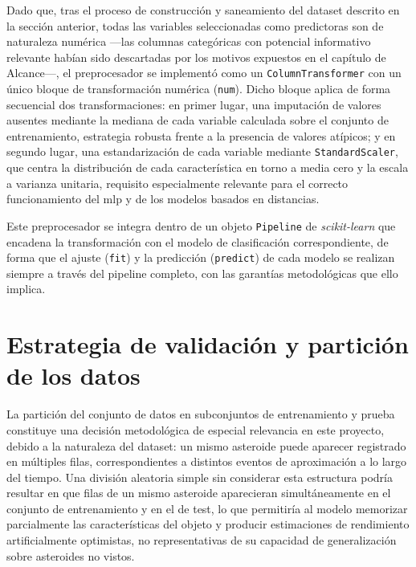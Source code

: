 \documentclass[12pt]{report} %
\begin{document}
Dado que, tras el proceso de construcción y saneamiento del dataset descrito en la sección anterior, todas las variables seleccionadas como predictoras son de naturaleza numérica ---las columnas categóricas con potencial informativo relevante habían sido descartadas por los motivos expuestos en el capítulo de Alcance---, el preprocesador se implementó como un \texttt{ColumnTransformer} con un único bloque de transformación numérica (\texttt{num}). Dicho bloque aplica de forma secuencial dos transformaciones: en primer lugar, una imputación de valores ausentes mediante la mediana de cada variable calculada sobre el conjunto de entrenamiento, estrategia robusta frente a la presencia de valores atípicos; y en segundo lugar, una estandarización de cada variable mediante \texttt{StandardScaler}, que centra la distribución de cada característica en torno a media cero y la escala a varianza unitaria, requisito especialmente relevante para el correcto funcionamiento del \gls{mlp} y de los modelos basados en distancias.
 
Este preprocesador se integra dentro de un objeto \texttt{Pipeline} de \textit{scikit-learn} que encadena la transformación con el modelo de clasificación correspondiente, de forma que el ajuste (\texttt{fit}) y la predicción (\texttt{predict}) de cada modelo se realizan siempre a través del pipeline completo, con las garantías metodológicas que ello implica.
 
\section{Estrategia de validación y partición de los datos}
 
La partición del conjunto de datos en subconjuntos de entrenamiento y prueba constituye una decisión metodológica de especial relevancia en este proyecto, debido a la naturaleza del dataset: un mismo asteroide puede aparecer registrado en múltiples filas, correspondientes a distintos eventos de aproximación a lo largo del tiempo. Una división aleatoria simple sin considerar esta estructura podría resultar en que filas de un mismo asteroide aparecieran simultáneamente en el conjunto de entrenamiento y en el de test, lo que permitiría al modelo memorizar parcialmente las características del objeto y producir estimaciones de rendimiento artificialmente optimistas, no representativas de su capacidad de generalización sobre asteroides no vistos.
 
\end{document}
